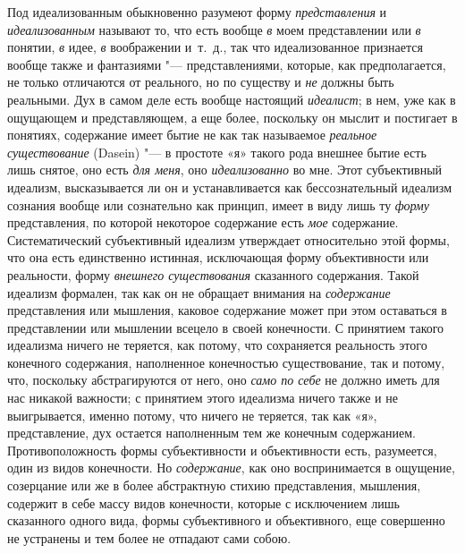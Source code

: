Под идеализованным обыкновенно разумеют форму
{\em представления} и
{\em идеализованным} называют то, что есть вообще
{\em в} моем представлении или
{\em в} понятии, {\em в} идее,
{\em в} воображении и~т.~д., так что идеализованное
признается вообще также и фантазиями "--- представлениями, которые, как
предполагается, не только отличаются от реального, но по существу и
{\em не} должны быть реальными. Дух в самом деле есть
вообще настоящий {\em идеалист}; в нем, уже как в
ощущающем и представляющем, а еще более, поскольку он мыслит и постигает в
понятиях, содержание имеет бытие не как так называемое
{\em реальное существование} (Dasein) "--- в простоте «я»
такого рода внешнее бытие есть лишь снятое, оно есть
{\em для меня}, оно
{\em идеализованно} во мне. Этот субъективный идеализм,
высказывается ли он и устанавливается как бессознательный идеализм сознания
вообще или сознательно как принцип, имеет в виду лишь ту
{\em форму} представления, по которой некоторое
содержание есть {\em мое} содержание. Систематический
субъективный идеализм утверждает относительно этой формы, что она есть
единственно истинная, исключающая форму объективности или реальности, форму
{\em внешнего существования} сказанного содержания.
Такой идеализм формален, так как он не обращает внимания на
{\em содержание} представления или мышления, каковое
содержание может при этом оставаться в представлении или мышлении всецело в
своей конечности. С принятием такого идеализма ничего не теряется, как
потому, что сохраняется реальность этого конечного содержания, наполненное
конечностью существование, так и потому, что, поскольку абстрагируются от
него, оно {\em само по себе} не должно иметь для нас
никакой важности; с принятием этого идеализма ничего также и не
выигрывается, именно потому, что ничего не теряется, так как «я»,
представление, дух остается наполненным тем же конечным содержанием.
Противоположность формы субъективности и объективности есть, разумеется,
один из видов конечности. Но {\em содержание}, как оно
воспринимается в ощущение, созерцание или же в более абстрактную стихию
представления, мышления, содержит в себе массу видов конечности, которые с
исключением лишь сказанного одного вида, формы субъективного и
объективного, еще совершенно не устранены и тем более не отпадают сами
собою.

\bigskip
